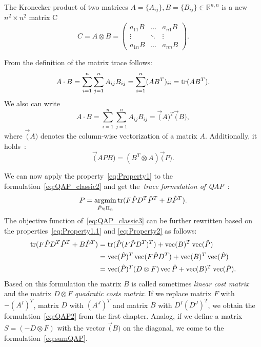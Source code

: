 The Kronecker  product of two matrices $A=\{A_{ij}\},B=\{B_{ij}\}\in\mathbb{R}^{n,n}$ is a new $n^2\times n^2$ matrix C
\begin{equation}\label{eq:kronecker}
C=A\otimes B =  	
\begin{pmatrix} a_{11}B & \dots & a_{n1}B \\ \vdots & \ddots & \vdots \\ a_{1n}B & \dots & a_{nn}B  \end{pmatrix}.
\end{equation}

From the definition of the matrix trace follows:
\begin{equation}\label{eq:Property1}
A\cdot B=\sum_{i=1}^{n}\sum_{j=1}^{n}A_{ij}B_{ij}=\sum_{i=1}^{n}(AB^T)_{ii}=\mathop{\rm tr}(AB^T).
\end{equation}
We also can write
\begin{equation}\label{eq:Property1.1}
A\cdot B=\sum_{i=1}^{n}\sum_{j=1}^{n}A_{ij}B_{ij}=\vec(A)^T\vec(B),
\end{equation}
where $\vec(A)$ denotes the column-wise vectorization of a matrix $A$. Additionally, it holds~\cite{Jain1989}:
\begin{equation}\label{eq:Property2}
\vec(APB)=(B^T\otimes A)\vec(P).
\end{equation}

We can now apply the property~\eqref{eq:Property1} to the formulation~\eqref{eq:QAP_classic2} and get the~\emph{trace formulation of QAP}~\cite{Burkard98thequadratic}:
\begin{equation}\label{eq:QAP_classic3}
P = \mathop{\rm argmin}_{\hat{P}\in\Pi_n}\mathop{\rm tr}(F\hat{P}D^T\hat{P}^T+B\hat{P}^T).
\end{equation}
The objective function of~\eqref{eq:QAP_classic3} can be further rewritten based on the properties~\eqref{eq:Property1.1} and \eqref{eq:Property2} as follows:
 \begin{align}\label{eq:QAP_classic4}
\mathop{\rm tr}(F\hat{P}D^T\hat{P}^T+B\hat{P}^T)&=\mathop{\rm tr}(\hat{P}(F\hat{P}D^T)^T)+\mathop{\rm vec}(B)^T\mathop{\rm vec}(\hat{P}) \notag\\	
									&=\mathop{\rm vec}(\hat{P})^T\mathop{\rm vec}(F\hat{P}D^T)+\mathop{\rm vec}(B)^T\mathop{\rm vec}(\hat{P}) \notag\\	
                                    &=\mathop{\rm vec}(\hat{P})^T(D\otimes F)\mathop{\rm vec}{\hat{P}}+\mathop{\rm vec}(B)^T\mathop{\rm vec}(\hat{P}).
\end{align}
Based on this formulation the matrix $B$ is called sometimes \emph{linear cost matrix} and the matrix $D\otimes F$ \emph{quadratic costs matrix}. If we replace  matrix $F$ with $-(A^I)^T$,  matrix $D$ with $(A^J)^T$ and  matrix $B$ with $D^I(D^J)^T$, we obtain the formulation~\eqref{eq:QAP2} from the first chapter. Analog, if we define a matrix $S=(-D\otimes F)$ with the vector $\vec(B)$ on the diagonal, we come to the formulation~\eqref{eq:sumQAP}.


